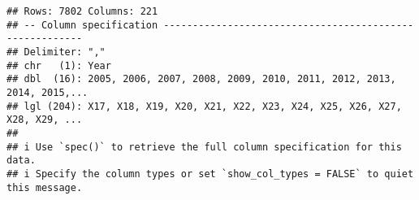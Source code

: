 \documentclass[
]{article}
\newenvironment{Shaded}{\begin{snugshade}}{\end{snugshade}}
\newcommand{\AttributeTok}[1]{\textcolor[rgb]{0.77,0.63,0.00}{#1}}
\newcommand{\CommentTok}[1]{\textcolor[rgb]{0.56,0.35,0.01}{\textit{#1}}}
\newcommand{\DecValTok}[1]{\textcolor[rgb]{0.00,0.00,0.81}{#1}}
\newcommand{\FunctionTok}[1]{\textcolor[rgb]{0.00,0.00,0.00}{#1}}
\newcommand{\NormalTok}[1]{#1}
\newcommand{\OtherTok}[1]{\textcolor[rgb]{0.56,0.35,0.01}{#1}}
\newcommand{\SpecialCharTok}[1]{\textcolor[rgb]{0.00,0.00,0.00}{#1}}
\newcommand{\StringTok}[1]{\textcolor[rgb]{0.31,0.60,0.02}{#1}}
\begin{document}
\begin{Shaded}
\end{Shaded}

\begin{verbatim}
## Rows: 7802 Columns: 221
## -- Column specification --------------------------------------------------------
## Delimiter: ","
## chr   (1): Year
## dbl  (16): 2005, 2006, 2007, 2008, 2009, 2010, 2011, 2012, 2013, 2014, 2015,...
## lgl (204): X17, X18, X19, X20, X21, X22, X23, X24, X25, X26, X27, X28, X29, ...
## 
## i Use `spec()` to retrieve the full column specification for this data.
## i Specify the column types or set `show_col_types = FALSE` to quiet this message.
\end{verbatim}
\end{document}
